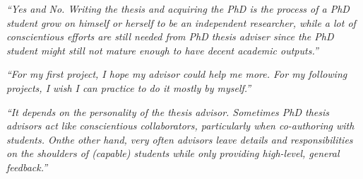 \documentclass[12pt]{beamer}
\newcommand\ans[1]{{\it ``#1''}}
\newcommand\gap{\vspace{5mm}}
\begin{document}
\begin{frame}
  
\ans{Yes and No.  Writing the thesis and acquiring the PhD is the process of a PhD student grow on himself or herself to be an independent researcher, while a lot of conscientious efforts are still needed from PhD thesis adviser since the PhD student might still not mature enough to have decent academic outputs.}

\gap

\ans{For my first project, I hope my advisor could help me more.  For my following projects, I wish I can practice to do it mostly by myself.}

\gap

\ans{It depends on the personality of the thesis advisor.  Sometimes PhD thesis advisors act like conscientious collaborators, particularly when co-authoring with students.  Onthe other hand, very often advisors leave details and responsibilities on the shoulders of (capable) students while only providing high-level, general feedback.}













\end{frame}
\end{document}
